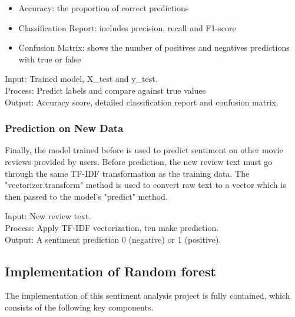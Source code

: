\begin{itemize}
    \item Accuracy: the proportion of correct predictions
    \item Classification Report: includes precision, recall and F1-score
    \item Confusion Matrix: shows the number of positives and negatives predictions with true or false
\end{itemize}

Input: Trained model, X\_test and y\_test. \\
Process: Predict labels and compare against true values \\
Output: Accuracy score, detailed classification report and confusion matrix.

\subsubsection{Prediction on New Data}
Finally, the model trained before is used to predict sentiment on other movie reviews provided by users. Before prediction, the new review text must go through the same TF-IDF transformation as the training data. The "vectorizer.transform" method is used to convert raw text to a vector which is then passed to the model's "predict" method.

Input: New review text. \\
Process: Apply TF-IDF vectorization, ten make prediction. \\
Output: A sentiment prediction 0 (negative) or 1 (positive).


\subsection{Implementation of Random forest}
The implementation of this sentiment analysis project is fully contained, which consists of the following key components.

